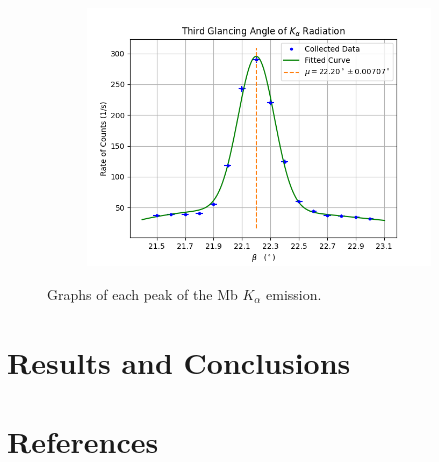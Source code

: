 \documentclass[twocolumn]{article}
\begin{document}
\begin{figure}[h!]
				\begin{subfigure}{.33\textwidth}
					\begin{center}
						\includegraphics[width = \textwidth]{../Graphs/Peak 6}
					\end{center}
					\label{alpha 3}
				\end{subfigure}
				\caption{Graphs of each peak of the Mb $K_\alpha$ emission.}
			\end{figure}
			
	\section{Results and Conclusions}
	
	\newpage
	\section*{References}
	
\end{document}
